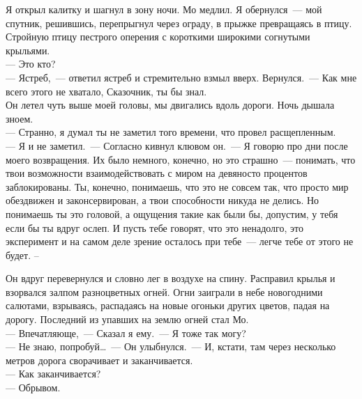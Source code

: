 Я открыл калитку и шагнул в зону ночи. Мо медлил. Я обернулся~--- мой спутник, 
решившись, перепрыгнул через ограду, в прыжке превращаясь в птицу. Стройную 
птицу пестрого оперения с короткими широкими согнутыми крыльями.\\
--- Это кто?\\
--- Ястреб,~--- ответил ястреб и стремительно взмыл вверх. Вернулся.~--- Как мне 
всего этого не хватало, Сказочник, ты бы знал.\\
Он летел чуть выше моей головы, мы двигались вдоль дороги. Ночь дышала зноем.\\
--- Странно, я думал ты не заметил того времени, что провел расщепленным. \\
--- Я и не заметил.~--- Согласно кивнул клювом он.~--- Я говорю про дни после 
моего возвращения. Их было немного, конечно, но это страшно~--- понимать, что твои 
возможности взаимодействовать с миром на девяносто процентов заблокированы. Ты, 
конечно, понимаешь, что это не совсем так, что просто мир обездвижен и 
законсервирован, а твои способности никуда не делись. Но понимаешь ты это 
головой, а ощущения такие как были бы, допустим, у тебя если бы ты вдруг ослеп. 
И пусть тебе говорят, что это ненадолго, это эксперимент и на самом деле зрение 
осталось при тебе~--- легче тебе от этого не будет. –

Он вдруг перевернулся и словно лег в воздухе на спину. Расправил крылья и 
взорвался залпом разноцветных огней. Огни заиграли в небе новогодними салютами, 
взрываясь, распадаясь на новые огоньки других цветов, падая на дорогу. 
Последний из упавших на землю огней стал Мо.\\
--- Впечатляюще,~--- Сказал я ему.~--- Я тоже так могу?\\
--- Не знаю, попробуй\ldots~--- Он улыбнулся.~--- И, кстати, там через несколько 
метров дорога сворачивает и заканчивается.\\
--- Как заканчивается?\\
--- Обрывом.


